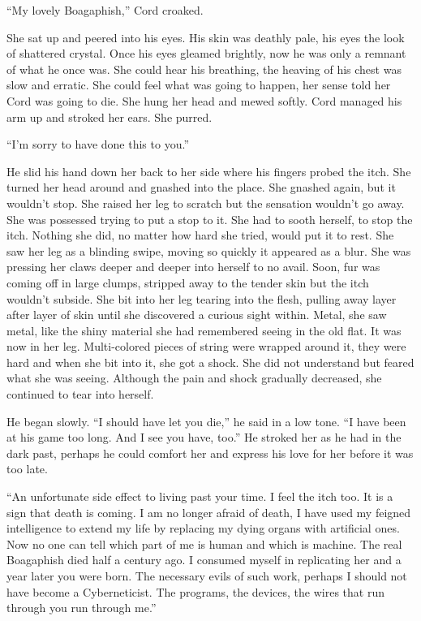 ``My lovely Boagaphish,'' Cord croaked.

She sat up and peered into his eyes. His skin was deathly pale, his eyes
the look of shattered crystal. Once his eyes gleamed brightly, now he
was only a remnant of what he once was. She could hear his breathing,
the heaving of his chest was slow and erratic. She could feel what was
going to happen, her sense told her Cord was going to die. She hung her
head and mewed softly. Cord managed his arm up and stroked her ears. She
purred.

``I'm sorry to have done this to you.''

He slid his hand down her back to her side where his fingers probed the
itch. She turned her head around and gnashed into the place. She gnashed
again, but it wouldn't stop. She raised her leg to scratch but the
sensation wouldn't go away. She was possessed trying to put a stop to
it. She had to sooth herself, to stop the itch. Nothing she did, no
matter how hard she tried, would put it to rest. She saw her leg as a
blinding swipe, moving so quickly it appeared as a blur. She was
pressing her claws deeper and deeper into herself to no avail. Soon, fur
was coming off in large clumps, stripped away to the tender skin but the
itch wouldn't subside. She bit into her leg tearing into the flesh,
pulling away layer after layer of skin until she discovered a curious
sight within. Metal, she saw metal, like the shiny material she had
remembered seeing in the old flat. It was now in her leg. Multi-colored
pieces of string were wrapped around it, they were hard and when she bit
into it, she got a shock. She did not understand but feared what she was
seeing. Although the pain and shock gradually decreased, she continued
to tear into herself.

He began slowly. ``I should have let you die,'' he said in a low tone.
``I have been at his game too long. And I see you have, too.'' He
stroked her as he had in the dark past, perhaps he could comfort her and
express his love for her before it was too late.

``An unfortunate side effect to living past your time. I feel the itch
too. It is a sign that death is coming. I am no longer afraid of death,
I have used my feigned intelligence to extend my life by replacing my
dying organs with artificial ones. Now no one can tell which part of me
is human and which is machine. The real Boagaphish died half a century
ago. I consumed myself in replicating her and a year later you were
born. The necessary evils of such work, perhaps I should not have become
a Cyberneticist. The programs, the devices, the wires that run through
you run through me.''

